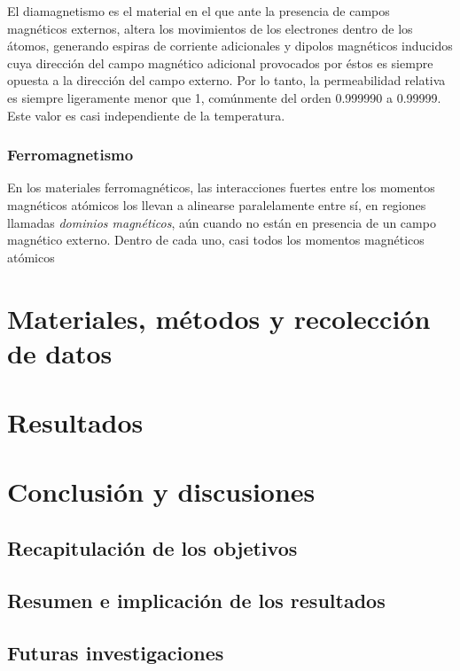 \documentclass[a4paper,12pt]{article}
\begin{document}
        El diamagnetismo es el material en el que ante la presencia de campos magnéticos externos, altera los movimientos de los electrones dentro de los átomos, generando espiras de corriente adicionales y dipolos magnéticos inducidos cuya dirección del campo magnético adicional provocados por éstos es siempre opuesta a la dirección del campo externo. Por lo tanto, la permeabilidad relativa es siempre ligeramente menor que 1, comúnmente del orden 0.999990 a 0.99999. Este valor es casi independiente de la temperatura.

    \subsubsection*{Ferromagnetismo}

        En los materiales ferromagnéticos, las interacciones fuertes entre los momentos magnéticos atómicos los llevan a alinearse paralelamente entre sí, en regiones llamadas \emph{dominios magnéticos}, aún cuando no están en presencia de un campo magnético externo. Dentro de cada uno, casi todos los momentos magnéticos atómicos  

\section*{Materiales, métodos y recolección de datos}

    

\section*{Resultados}

    

\section*{Conclusión y discusiones}

    \subsection*{Recapitulación de los objetivos}



    \subsection*{Resumen e implicación de los resultados}



    \subsection*{Futuras investigaciones}
\end{document}
